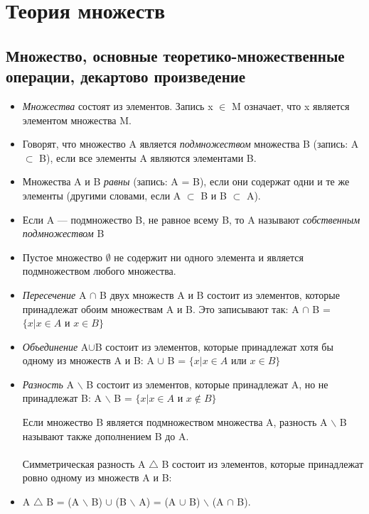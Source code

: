 \setcounter{section}{1}
\section{Теория множеств}

\subsection{Множество, основные теоретико-множественные операции, декартово произведение}
\begin{itemize}
    \item [] \textit{Множества} состоят из элементов. Запись x $\in$ M означает, что x является элементом множества M.
    \item [] Говорят, что множество A является \textit{подмножеством} множества B (запись: A $\subset$ B), если все элементы A являются элементами B.
    \item [] Множества A и B  \textit{равны} (запись: A = B), если они содержат
одни и те же элементы (другими словами, если A $\subset$ B и B $\subset$ A).
\item [] Если A — подмножество B, не равное всему B, то A называют
 \textit{собственным подмножеством} B

 \item [] Пустое множество $\emptyset$ не содержит ни одного элемента и является подмножеством любого множества.

 \item []   \textit{Пересечение} A $\cap$ B двух множеств A и B состоит из элементов, которые принадлежат обоим множествам A и B. Это записывают так: A  $\cap$ B = $\{x | x \in A$ и $x \in B\}$ 
 \item []  \textit{Объединение} A$\cup$B состоит из элементов, которые принадлежат хотя бы одному из множеств A и B:
A  $\cup$ B = $\{x | x \in A$ или $x \in B\}$ 

 \item []  \textit{Разность} A $\backslash$ B состоит из элементов, которые принадлежат A, но не принадлежат B:
A  $\backslash$ B = $\{x | x \in A$ и $x \not\in B\}$ 

Если множество B является подмножеством множества A, разность A $\backslash$ B называют также дополнением B до A. \\ \\
Симметрическая разность A $\triangle$ B состоит из элементов, которые принадлежат ровно одному из множеств A и B:

 \item [] A $\triangle$ B = (A $\backslash$ B) $\cup$ (B $\backslash$ A) = (A $\cup$ B) $\backslash$ (A $\cap$ B).
\end{itemize}
